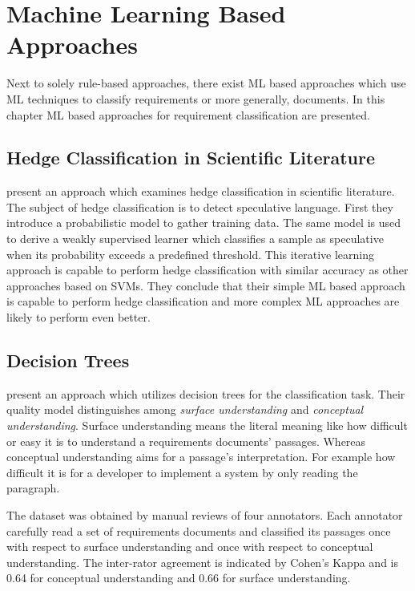 \section{Machine Learning Based Approaches}
\label{chp:related_research:sec:machine_learingn_based_approaches}

Next to solely rule-based approaches, there exist \ac{ML} based approaches which use \ac{ML} techniques to classify requirements or more generally, documents.
In this chapter \ac{ML} based approaches for requirement classification are presented.

\subsection{Hedge Classification in Scientific Literature}
\textcite{Medlock:2007} present an approach which examines hedge classification in scientific literature.
The subject of hedge classification is to detect speculative language.
First they introduce a probabilistic model to gather training data.
The same model is used to derive a weakly supervised learner which classifies a sample as speculative when its probability exceeds a predefined threshold.
This iterative learning approach is capable to perform hedge classification with similar accuracy as other approaches based on \acp{SVM}.
They conclude that their simple \ac{ML} based approach is capable to perform hedge classification and more complex \ac{ML} approaches are likely to perform even better.

\subsection{Decision Trees}
\textcite{Ormandjieva:2007} present an approach which utilizes decision trees for the classification task.
Their quality model distinguishes among \textit{surface understanding} and \textit{conceptual understanding}.
Surface understanding means the literal meaning like how difficult or easy it is to understand a requirements documents' passages.
Whereas conceptual understanding aims for a passage's interpretation.
For example how difficult it is for a developer to implement a system by only reading the paragraph.

The dataset was obtained by manual reviews of four annotators.
Each annotator carefully read a set of requirements documents and classified its passages once with respect to surface understanding and once with respect to conceptual understanding.
The inter-rator agreement is indicated by Cohen's Kappa \parencite{Cohen:1960} and is 0.64 for conceptual understanding and 0.66 for surface understanding.

